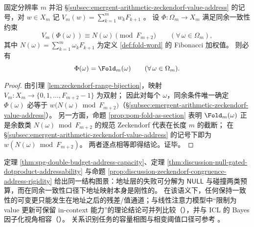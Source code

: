 \begin{proposition}\label{prop:discussion-zeckendorf-congruence-address-rigidity}
固定分辨率 \(m\) 并沿 \S\ref{subsec:emergent-arithmetic-zeckendorf-value-address} 的记号，对 \(w\in X_m\) 记
\(
V_m(w)=\sum_{k=1}^m w_k F_{k+1}
\)
。
设 \(\Phi:\Omega_m\to X_m\) 满足同余一致性约束
\[
V_m(\Phi(\omega))\equiv N(\omega)\pmod{F_{m+2}}\qquad(\forall\,\omega\in\Omega_m),
\]
其中 \(N(\omega)=\sum_{k=1}^m \omega_k F_{k+1}\) 为定义 \ref{def:fold-word} 的 Fibonacci 加权值。
则必有
\[
\Phi(\omega)=\Fold_m(\omega)\qquad(\forall\,\omega\in\Omega_m).
\]
\end{proposition}
\begin{proof}
由引理 \ref{lem:zeckendorf-range-bijection}，映射 \(V_m:X_m\to\{0,1,\dots,F_{m+2}-1\}\) 为双射；
因此对每个 \(\omega\)，同余条件唯一确定 \(\Phi(\omega)\) 必等于 \(w\bigl(N(\omega)\bmod F_{m+2}\bigr)\)（\S\ref{subsec:emergent-arithmetic-zeckendorf-value-address}）。
另一方面，命题 \ref{prop:pom-fold-as-section} 表明 \(\Fold_m(\omega)\) 正是余数类 \(N(\omega)\bmod F_{m+2}\) 的规范 Zeckendorf 代表在长度 \(m\) 的截断；
在 \S\ref{subsec:emergent-arithmetic-zeckendorf-value-address} 的记号下即为 \(w(N(\omega)\bmod F_{m+2})\)。
两者逐点相等即得结论。证毕。
\end{proof}

\begin{remark}
定理 \ref{thm:spg-double-budget-address-capacity}、定理 \ref{thm:discussion-null-gated-dotproduct-addressability} 与命题 \ref{prop:discussion-zeckendorf-congruence-address-rigidity} 给出同一结构图景：地址层的失败可分解为 \(\mathsf{NULL}\) 与碰撞两类预算，而在同余一致性口径下地址映射本身是刚性的。
在该语义下，任何保持一致性的可变更只能发生在地址之后的残差/值通道；与线性注意力模型中“限制为 value 更新可保留 in-context 能力”的理论结论可并列比较（\cite{LeeSohnLee2026FinetuneNoForgetICLLinearAttention}），并与 ICL 的 Bayes 因子化视角相容（\cite{ReuterRudnerFortuinRugamer2025FullBayesICL}）。
关系识别任务的容量相图与相变阈值口径可参考 \cite{Adler2026CapacityRationaleMultiHeadAttention}。
\end{remark}

